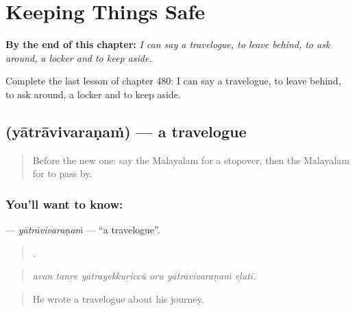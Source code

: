 
\chapter{Keeping Things Safe}
\label{ch:ml-keeping-things-safe}

\begin{chapteropening}
\textbf{By the end of this chapter:} \emph{I can say a travelogue, to leave behind, to ask around, a locker and to keep aside.}

Complete the last lesson of chapter 480: I can say a travelogue, to leave behind, to ask around, a locker and to keep aside.
\end{chapteropening}

\section[\texorpdfstring{\ml{യാത്രാവിവരണം} (yātrāvivaraṇaṁ)}{യാത്രാവിവരണം (yātrāvivaraṇaṁ)}]{ (yātrāvivaraṇaṁ) — a travelogue}

\label{lesson:ML-C480-yatravivaranam}



\begin{quote}
Before the new one: say the Malayalam for a stopover, then the Malayalam for to pass by.
\end{quote}

\subsection*{You'll want to know: }
\textbf{} — \emph{yātrāvivaraṇaṁ} — \textquotedblleft{}a travelogue\textquotedblright{}.

\begin{quote}
     .
\end{quote}

\begin{quote}
\emph{avan tanṟe yātrayekkuṟiccŭ oru yātrāvivaraṇaṁ eḻuti.}
\end{quote}

\begin{quote}
He wrote a travelogue about his journey.
\end{quote}

